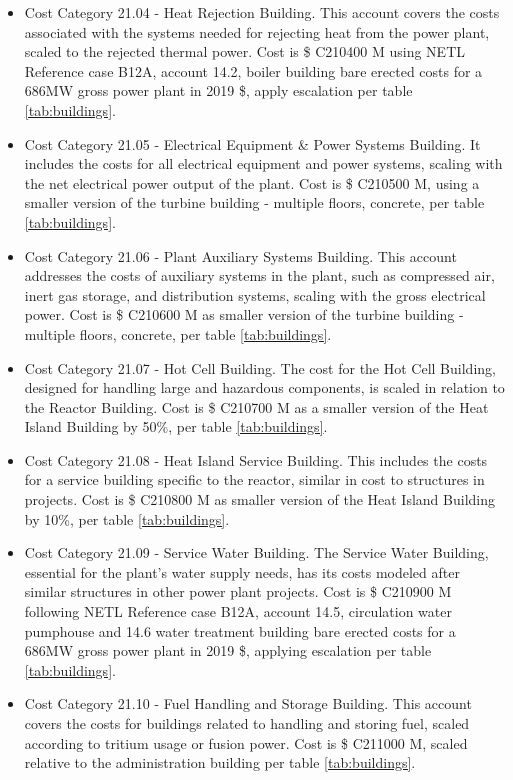\begin{itemize}
\item Cost Category 21.04 - Heat Rejection Building. This account covers the costs associated with the systems needed for rejecting heat from the power plant, scaled to the rejected thermal power. Cost is \$ C210400 M using NETL Reference case B12A, account 14.2, boiler building bare erected costs for a 686MW gross power plant in 2019 \$, apply escalation per table \ref{tab:buildings}. 
\item Cost Category 21.05 - Electrical Equipment \& Power Systems Building. It includes the costs for all electrical equipment and power systems, scaling with the net electrical power output of the plant. Cost is \$ C210500 M, using a smaller version of the turbine building - multiple floors, concrete, per table \ref{tab:buildings}.
\item Cost Category 21.06 - Plant Auxiliary Systems Building. This account addresses the costs of auxiliary systems in the plant, such as compressed air, inert gas storage, and distribution systems, scaling with the gross electrical power. Cost is \$ C210600 M as smaller version of the turbine building - multiple floors, concrete, per table \ref{tab:buildings}. 
\item Cost Category 21.07 - Hot Cell Building. The cost for the Hot Cell Building, designed for handling large and hazardous components, is scaled in relation to the Reactor Building.  Cost is \$ C210700 M as a smaller version of the Heat Island Building by 50\%, per table \ref{tab:buildings}.  
\item Cost Category 21.08 - Heat Island Service Building. This includes the costs for a service building specific to the reactor, similar in cost to structures in projects. Cost is \$ C210800 M as smaller version of the Heat Island Building by 10\%, per table \ref{tab:buildings}.  
\item Cost Category 21.09 - Service Water Building. The Service Water Building, essential for the plant’s water supply needs, has its costs modeled after similar structures in other power plant projects. Cost is \$ C210900 M following NETL Reference case B12A, account 14.5, circulation water pumphouse and 14.6 water treatment building bare erected costs for a 686MW gross power plant in 2019 \$, applying escalation per table \ref{tab:buildings}.
\item Cost Category 21.10 - Fuel Handling and Storage Building. This account covers the costs for buildings related to handling and storing fuel, scaled according to tritium usage or fusion power. Cost is \$ C211000 M, scaled relative to the administration building per table \ref{tab:buildings}. 

\end{itemize}
